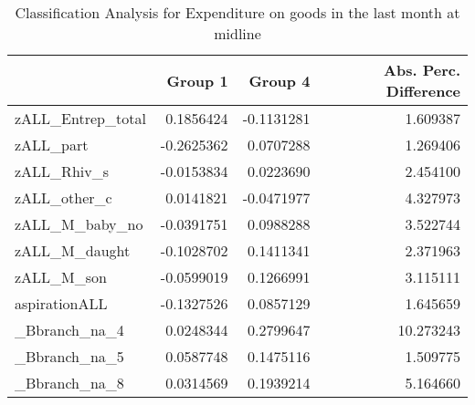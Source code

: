 \begin{table}

\caption{\label{tab:clanRExpenditure_totDF}Classification Analysis for Expenditure on goods in the last month at midline}
\centering
\begin{tabular}[t]{lrrr}
\toprule
  & Group 1 & Group 4 & Abs. Perc. Difference\\
\midrule
zALL\_Entrep\_total & 0.1856424 & -0.1131281 & 1.609387\\
zALL\_part & -0.2625362 & 0.0707288 & 1.269406\\
zALL\_Rhiv\_s & -0.0153834 & 0.0223690 & 2.454100\\
zALL\_other\_c & 0.0141821 & -0.0471977 & 4.327973\\
zALL\_M\_baby\_no & -0.0391751 & 0.0988288 & 3.522744\\
\addlinespace
zALL\_M\_daught & -0.1028702 & 0.1411341 & 2.371963\\
zALL\_M\_son & -0.0599019 & 0.1266991 & 3.115111\\
aspirationALL & -0.1327526 & 0.0857129 & 1.645659\\
\_Bbranch\_na\_4 & 0.0248344 & 0.2799647 & 10.273243\\
\_Bbranch\_na\_5 & 0.0587748 & 0.1475116 & 1.509775\\
\addlinespace
\_Bbranch\_na\_8 & 0.0314569 & 0.1939214 & 5.164660\\
\bottomrule
\end{tabular}
\end{table}
